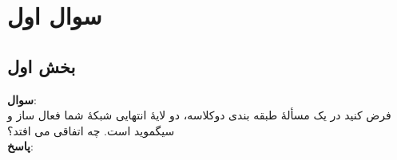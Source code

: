 \documentclass{article}
\begin{document}
	
	
	
	\tableofcontents \clearpage
	\listoffigures \clearpage
	\listoftables \clearpage
	\lstlistoflistings \clearpage
	\newpage
	
	\section{ سوال اول}\label{Section1}
	\subsection{بخش اول}
	{\large \textbf{سوال}:} \\
	فرض کنید در یک مسألۀ طبقه بندی دوکلاسه، دو لایۀ انتهایی شبکۀ شما فعال ساز 
	و سیگموید است. چه اتفاقی می افتد؟‎\\
	
	{\large \textbf{پاسخ}:} 
	
\end{document}
